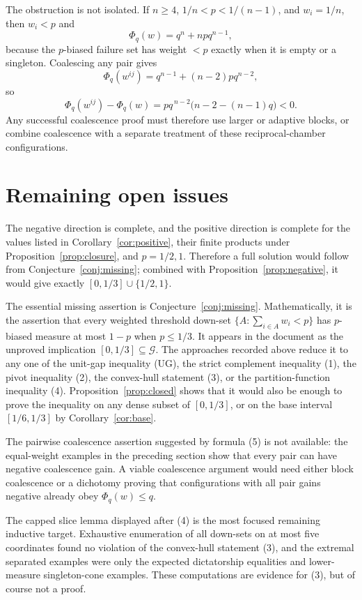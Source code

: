 \documentclass[12pt]{article}
\begin{document}
The obstruction is not isolated.  If \(n\ge4\),
\(1/n<p<1/(n-1)\), and \(w_i=1/n\), then \(w_i<p\) and
\[
 \Phi_q(w)=q^n+npq^{n-1},
\]
because the \(p\)-biased failure set has weight \(<p\) exactly when it is empty
or a singleton.  Coalescing any pair gives
\[
 \Phi_q(w^{ij})=q^{n-1}+(n-2)pq^{n-2},
\]
so
\[
 \Phi_q(w^{ij})-\Phi_q(w)
   =p q^{\,n-2}\bigl(n-2-(n-1)q\bigr)<0 .
\]
Any successful coalescence proof must therefore use larger or adaptive blocks,
or combine coalescence with a separate treatment of these reciprocal-chamber
configurations.
\section*{Remaining open issues}

The negative direction is complete, and the positive direction is complete for
the values listed in Corollary~\ref{cor:positive}, their finite products under
Proposition~\ref{prop:closure}, and \(p=1/2,1\).  Therefore a full solution
would follow from Conjecture~\ref{conj:missing}; combined with
Proposition~\ref{prop:negative}, it would give exactly
\([0,1/3]\cup\{1/2,1\}\).

The essential missing assertion is Conjecture~\ref{conj:missing}.  Mathematically, it
is the assertion that every weighted threshold down-set
\(\{A:\sum_{i\in A}w_i<p\}\) has \(p\)-biased measure at most \(1-p\) when
\(p\le1/3\).  It appears in the document as the unproved implication
\([0,1/3]\subseteq\mathcal G\).  The approaches recorded above reduce it to
any one of the unit-gap inequality (UG), the strict complement inequality (1),
the pivot inequality (2), the convex-hull statement (3), or the
partition-function inequality (4).  Proposition~\ref{prop:closed} shows that it
would also be enough to prove the inequality on any dense subset of
\([0,1/3]\), or on the base interval \([1/6,1/3]\) by
Corollary~\ref{cor:base}.

The pairwise coalescence assertion suggested by formula (5) is not available:
the equal-weight examples in the preceding section show that every pair can have
negative coalescence gain.  A viable coalescence argument would need either block
coalescence or a dichotomy proving that configurations with all pair gains
negative already obey \(\Phi_q(w)\le q\).

The capped slice lemma displayed after (4) is the most focused remaining
inductive target.  Exhaustive enumeration of all down-sets on at most five
coordinates found no violation of the convex-hull statement (3), and the
extremal separated examples were only the expected dictatorship equalities and
lower-measure singleton-cone examples.  These computations are evidence for
(3), but of course not a proof.
\end{document}
